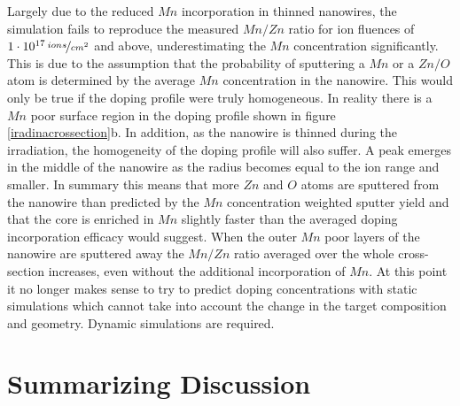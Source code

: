 Largely due to the reduced $Mn$ incorporation in thinned nanowires, the simulation fails to reproduce the measured $Mn/Zn$ ratio for ion fluences of $1\cdot 10^{17}\,\nicefrac{ions}{cm^2}$ and above, underestimating the $Mn$ concentration significantly. This is due to the assumption that the probability of sputtering a $Mn$ or a $Zn/O$ atom is determined by the average $Mn$ concentration in the nanowire. This would only be true if the doping profile were truly homogeneous. In reality there is a $Mn$ poor surface region in the doping profile shown in figure \ref{iradinacrossection}b. In addition, as the nanowire is thinned during the irradiation, the homogeneity of the doping profile will also suffer. A peak emerges in the middle of the nanowire as the radius becomes equal to the ion range and smaller. In summary this means that more $Zn$ and $O$ atoms are sputtered from the nanowire than predicted by the $Mn$ concentration weighted sputter yield and that the core is enriched in $Mn$ slightly faster than the averaged doping incorporation efficacy would suggest. When the outer $Mn$ poor layers of the nanowire are sputtered away the $Mn/Zn$ ratio averaged over the whole cross-section increases, even without the additional incorporation of $Mn$. At this point it no longer makes sense to try to predict doping concentrations with static simulations which cannot take into account the change in the target composition and geometry. Dynamic simulations are required.
 

\section{Summarizing Discussion}

